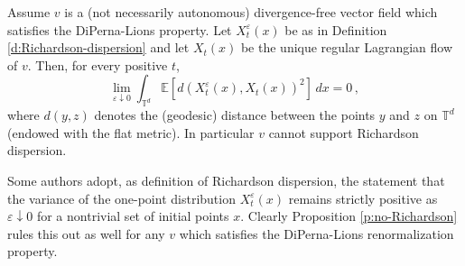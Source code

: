 \documentclass[10pt,a4paper]{amsart}
\begin{document}
\begin{proposition}\label{p:no-Richardson}
Assume $v$ is a (not necessarily autonomous) divergence-free vector field which satisfies the DiPerna-Lions property.  Let $X^\varepsilon_t (x)$ be as in Definition \ref{d:Richardson-dispersion} and let $X_t (x)$ be the unique regular Lagrangian flow of $v$. Then, for every positive $t$, 
\[
\lim_{\varepsilon\downarrow 0} \int_{\mathbb T^d} {\mathbb E} [ d (X^\varepsilon_t (x), X_t (x))^2]\, dx = 0\, ,
\]
where $d (y,z)$ denotes the (geodesic) distance between the points $y$ and $z$ on $\mathbb T^d$ (endowed with the flat metric). In particular $v$ cannot support Richardson dispersion.
\end{proposition}

\begin{remark}
Some authors adopt, as definition of Richardson dispersion, the statement that the variance of the one-point distribution $X^\varepsilon_t (x)$ remains strictly positive as $\varepsilon\downarrow 0$ for a nontrivial set of initial points $x$. Clearly Proposition \ref{p:no-Richardson} rules this out as well for any $v$ which satisfies the DiPerna-Lions renormalization property. 
\end{remark}
\end{document}
